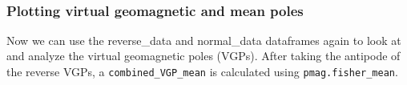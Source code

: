 \documentclass{article}
\begin{document}
    \begin{center}
    \end{center}
    { \hspace*{\fill} \\}
    

    \subsubsection{Plotting virtual geomagnetic and mean poles}


    Now we can use the reverse\_data and normal\_data dataframes again to
look at and analyze the virtual geomagnetic poles (VGPs). After taking
the antipode of the reverse VGPs, a \texttt{combined\_VGP\_mean} is
calculated using \texttt{pmag.fisher\_mean}.
\end{document}
